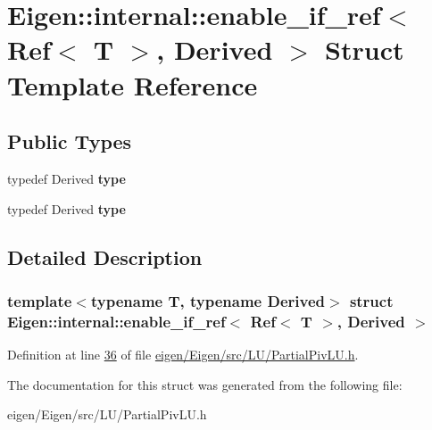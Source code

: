 \hypertarget{struct_eigen_1_1internal_1_1enable__if__ref_3_01_ref_3_01_t_01_4_00_01_derived_01_4}{}\section{Eigen\+:\+:internal\+:\+:enable\+\_\+if\+\_\+ref$<$ Ref$<$ T $>$, Derived $>$ Struct Template Reference}
\label{struct_eigen_1_1internal_1_1enable__if__ref_3_01_ref_3_01_t_01_4_00_01_derived_01_4}
\subsection*{Public Types}
\begin{DoxyCompactItemize}
\item 
\mbox{\label{struct_eigen_1_1internal_1_1enable__if__ref_3_01_ref_3_01_t_01_4_00_01_derived_01_4_acdcd99f53faa27f1a901fb4610528f02}} 
typedef Derived {\bfseries type}
\item 
\mbox{\label{struct_eigen_1_1internal_1_1enable__if__ref_3_01_ref_3_01_t_01_4_00_01_derived_01_4_acdcd99f53faa27f1a901fb4610528f02}} 
typedef Derived {\bfseries type}
\end{DoxyCompactItemize}


\subsection{Detailed Description}
\subsubsection*{template$<$typename T, typename Derived$>$\newline
struct Eigen\+::internal\+::enable\+\_\+if\+\_\+ref$<$ Ref$<$ T $>$, Derived $>$}



Definition at line \hyperlink{eigen_2_eigen_2src_2_l_u_2_partial_piv_l_u_8h_source_l00036}{36} of file \hyperlink{eigen_2_eigen_2src_2_l_u_2_partial_piv_l_u_8h_source}{eigen/\+Eigen/src/\+L\+U/\+Partial\+Piv\+L\+U.\+h}.



The documentation for this struct was generated from the following file\+:\begin{DoxyCompactItemize}
\item 
eigen/\+Eigen/src/\+L\+U/\+Partial\+Piv\+L\+U.\+h\end{DoxyCompactItemize}
